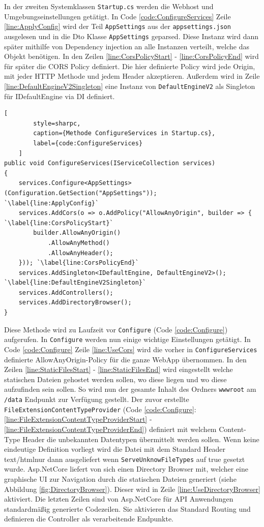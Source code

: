 In der zweiten Systemklassen \texttt{Startup.cs} werden die
Webhost und Umgebungseinstellungen getätigt.
In Code \ref{code:ConfigureServices} Zeile \ref{line:ApplyConfig}
wird der Teil \texttt{AppSettings} aus der
\texttt{appsettings.json} ausgelesen und in die Dto Klasse
\texttt{AppSettings} geparsed. Diese Instanz wird dann später
mithilfe von Dependency injection an alle Instanzen verteilt,
welche das Objekt benötigen. In den Zeilen \ref{line:CorsPolicyStart}
- \ref{line:CorsPolicyEnd} wird für später die CORS Policy definiert.
Die hier definierte Policy wird jede Origin, mit jeder HTTP Methode
und jedem Header akzeptieren. Außerdem wird in Zeile
\ref{line:DefaultEngineV2Singleton} eine Instanz von \texttt{DefaultEngineV2}
als Singleton für IDefaultEngine via DI definiert.

\begin{codeblock}
	\begin{lstlisting}[
		style=sharpc,
		caption={Methode ConfigureServices in Startup.cs},
		label={code:ConfigureServices}
	]
public void ConfigureServices(IServiceCollection services)
{
	services.Configure<AppSettings>(Configuration.GetSection("AppSettings"));	`\label{line:ApplyConfig}`
	services.AddCors(o => o.AddPolicy("AllowAnyOrigin", builder => { `\label{line:CorsPolicyStart}`
		builder.AllowAnyOrigin()
			.AllowAnyMethod()
			.AllowAnyHeader();
	})); `\label{line:CorsPolicyEnd}`
	services.AddSingleton<IDefaultEngine, DefaultEngineV2>(); `\label{line:DefaultEngineV2Singleton}`
	services.AddControllers();
	services.AddDirectoryBrowser();
}
	\end{lstlisting}
\end{codeblock}

Diese Methode wird zu Laufzeit vor \texttt{Configure}
(Code \ref{code:Configure}) aufgerufen. In \texttt{Configure} werden nun
einige wichtige Einstellungen getätigt. In Code \ref{code:Configure}
Zeile \ref{line:UseCors} wird die vorher in \texttt{ConfigureServices} definierte
\grqq AllowAnyOrigin\grqq -Policy für die ganze WebApp übernommen.
In den Zeilen \ref{line:StaticFilesStart} - \ref{line:StaticFilesEnd}
wird eingestellt welche statischen Dateien gehostet werden sollen,
wo diese liegen und wo diese aufzufinden sein sollen. So wird nun
der gesamte Inhalt des Ordners \texttt{wwwroot} am \texttt{/data} Endpunkt zur
Verfügung gestellt. Der zuvor erstellte \texttt{FileExtensionContentTypeProvider}
(Code \ref{code:Configure}:
\ref{line:FileExtensionContentTypeProviderStart} -
\ref{line:FileExtensionContentTypeProviderEnd})
definiert mit welchem Content-Type Header die \grqq unbekannten\grqq\space
Datentypen übermittelt werden sollen. Wenn keine eindeutige
Definition vorliegt wird die Datei mit dem Standard Header
\grqq text/html\grqq\space nur dann ausgeliefert wenn \texttt{ServeUnknowFileTypes} auf
true gesetzt wurde.
Asp.NetCore liefert von sich einen Directory Browser mit,
welcher eine graphische UI zur Navigation durch die statischen
Dateien generiert (siehe Abbildung \ref{fig:DirectoryBrowser}).
Dieser wird in Zeile \ref{line:UseDirectoryBrowser} aktiviert.
Die letzten Zeilen sind von Asp.NetCore für API Anwendungen
standardmäßig generierte Codezeilen. Sie aktivieren das Standard
Routing und definieren die Controller als verarbeitende Endpunkte.

